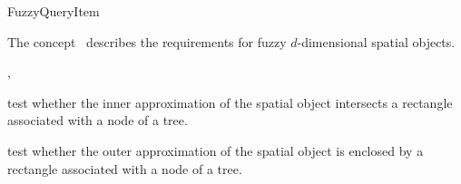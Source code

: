 

\begin{ccRefConcept}{FuzzyQueryItem}


\ccDefinition
  
The concept \ccRefName\ describes the requirements for fuzzy $d$-dimensional spatial objects.

\ccHasModels

,\\

\ccTypes





\ccOperations


{test whether the inner approximation of the spatial object intersects a rectangle
associated with a node of a tree. }

{test whether the outer approximation of the spatial object is enclosed by a rectangle
associated with a node of a tree.}





\end{ccRefConcept}



